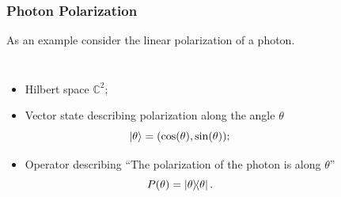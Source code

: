 \documentclass{beamer}
\begin{document}
\begin{frame}[fragile]

	\frametitle{Photon Polarization}

	As an example consider the linear polarization of a photon.
	
	\begin{columns}
	
		\begin{itemize}
	
			\item Hilbert space $\mathbb{C}^2$;
			\item Vector state describing polarization along the angle $\theta$ 
			\begin{equation}
				\ket{\theta}=(\cos(\theta),\sin(\theta));
			\end{equation}
			\item Operator describing ``The polarization of the photon is along $\theta$''
			\begin{equation}
				P(\theta)=\dyad{\theta}.
			\end{equation}
					
		\end{itemize}
	

	\end{columns}

\end{frame}
\end{document}
